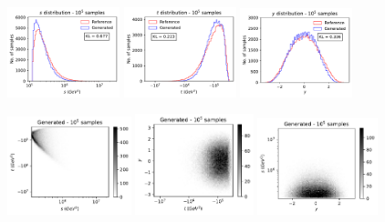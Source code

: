 \documentclass[twocolumn,preprintnumbers,superscriptaddress]{revtex4-2}
\begin{document}
\begin{figure}

  \includegraphics[width=0.29\textwidth]{plots/hardware/ibm_santiago/s-distribution_IBM_LHCdata_100k.pdf}%
  \includegraphics[width=0.29\textwidth]{plots/hardware/ibm_santiago/t-distribution_IBM_LHCdata_100k.pdf}%
  \includegraphics[width=0.29\textwidth]{plots/hardware/ibm_santiago/y-distribution_IBM_LHCdata_100k.pdf}

  \includegraphics[width=0.32\textwidth]{plots/hardware/ibm_santiago/s-t_FAKE_IBM_100k.pdf}%
  \includegraphics[width=0.305\textwidth]{plots/hardware/ibm_santiago/t-y_FAKE_IBM_100k.pdf}%
  \includegraphics[width=0.31\textwidth]{plots/hardware/ibm_santiago/y-s_FAKE_IBM_100k.pdf}


\end{figure}
\end{document}
